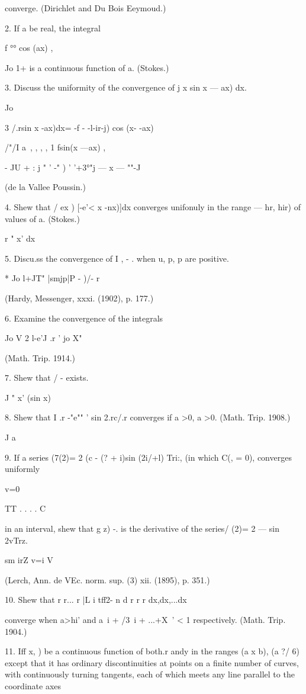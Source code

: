 converge. (Dirichlet and Du Bois Eeymoud.) 

2. If a be real, the integral 

f °° cos (ax) , 

Jo 1+  
is a continuous function of a. (Stokes.) 

3. Discuss the uniformity of the convergence of j x sin  x  — ax) dx. 

Jo 

3 /.rsin  x -ax)dx= -f - -l-ir-j) cos (x- -ax) 

/"/I a\ , , , , 1   fsin(x —ax) , ~\ 

- JU  + : j " ' -" ) ' '+3°"j — x  —  ""-J 

(de la Vallee Poussin.) 

4. Shew that / ex ) [-e'<  x -nx)]dx converges unifonuly in the range   — hr, hir) 
of values of a. (Stokes.) 

r " x' dx 

5. Discu.ss the convergence of I , - . when u, p, p are positive. 

* Jo l+JT" |smjp|P  -  )/- r 

(Hardy, Messenger, xxxi. (1902), p. 177.) 

6. Examine the convergence of the integrals 

Jo V 2 l-e'J .r ' jo X" 

(Math. Trip. 1914.) 

7. Shew that / -  exists. 

J "  x'  (sin x)  

8. Shew that I .r -"e"" ' sin 2.rc/.r converges if a >0, a >0. (Math. Trip. 1908.) 

J a 

9. If a series (7(2)= 2 (c - (?  + i)sin (2i/+l) Tri:, (in which C(, = 0), converges uniformly 

v=0 

TT . . . .   C 

in an interval, shew that g  z) -. is the derivative of the series/ (2)= 2 — sin 2vTrz. 

sm irZ v=i V 

(Lerch, Ann. de VEc. norm. sup. (3) xii. (1895), p. 351.) 

10. Shew that r r... r |L i tff2- n   d r r r dx,dx,...dx  

converge when a>hi' and a~i + /3~i + ...+X~' < 1 respectively. (Math. Trip. 1904.) 

11. Iff x, ) be a continuous function of both.r andy in the ranges (a x b), (a ?/ 6) 
except that it has ordinary discontinuities at points on a finite number of curves, with 
continuously turning tangents, each of which meets any line parallel to the coordinate axes 


